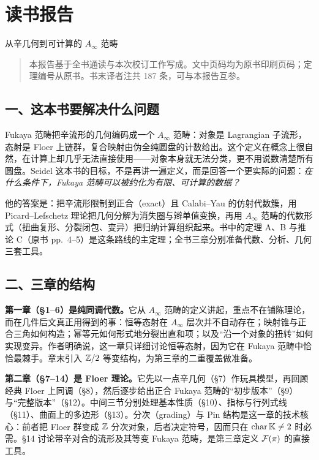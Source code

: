 \chapter*{读书报告}
\begin{center}
\large 从辛几何到可计算的 $A_\infty$ 范畴
\end{center}

\begin{quote}
\small 本报告基于全书通读与本次校订工作写成。文中页码均为原书印刷页码；定理编号从原书。书末译者注共 187 条，可与本报告互参。
\end{quote}

\section*{一、这本书要解决什么问题}

Fukaya 范畴把辛流形的几何编码成一个 $A_\infty$ 范畴：对象是 Lagrangian 子流形，态射是 Floer 上链群，复合映射由伪全纯圆盘的计数给出。这个定义在概念上很自然，在计算上却几乎无法直接使用——对象本身就无法分类，更不用说数清楚所有圆盘。Seidel 这本书的目标，不是再讲一遍定义，而是回答一个更实际的问题：\emph{在什么条件下，Fukaya 范畴可以被约化为有限、可计算的数据？}

他的答案是：把辛流形限制到正合（exact）且 Calabi--Yau 的仿射代数簇，用 Picard--Lefschetz 理论把几何分解为消失圈与辫单值变换，再用 $A_\infty$ 范畴的代数形式（扭曲复形、分裂闭包、变异）把归纳计算组织起来。书中的定理 A、B 与推论 C（原书 pp.~4--5）是这条路线的主定理；全书三章分别准备代数、分析、几何三套工具。

\section*{二、三章的结构}

\textbf{第一章（§1--6）是纯同调代数。}它从 $A_\infty$ 范畴的定义讲起，重点不在铺陈理论，而在几件后文真正用得到的事：恒等态射在 $A_\infty$ 层次并不自动存在；映射锥与正合三角如何构造；幂等元如何形式地分裂出直和项；以及“沿一个对象的扭转”如何实现变异。作者明确说，这一章只详细讨论恒等态射，因为它在 Fukaya 范畴中恰恰最棘手。章末引入 $\mathbb Z/2$ 等变结构，为第三章的二重覆盖做准备。

\textbf{第二章（§7--14）是 Floer 理论。}它先以一点辛几何（§7）作玩具模型，再回顾经典 Floer 上同调（§8），然后逐步给出正合 Fukaya 范畴的“初步版本”（§9）与“完整版本”（§12）。中间三节分别处理基本性质（§10）、指标与行列式线（§11）、曲面上的多边形（§13）。分次（grading）与 Pin 结构是这一章的技术核心：前者把 Floer 群变成 $\mathbb Z$ 分次对象，后者决定符号，因而只在 $\operatorname{char}\mathbb K\ne2$ 时必需。§14 讨论带辛对合的流形及其等变 Fukaya 范畴，是第三章定义 $\mathcal F(\pi)$ 的直接工具。

